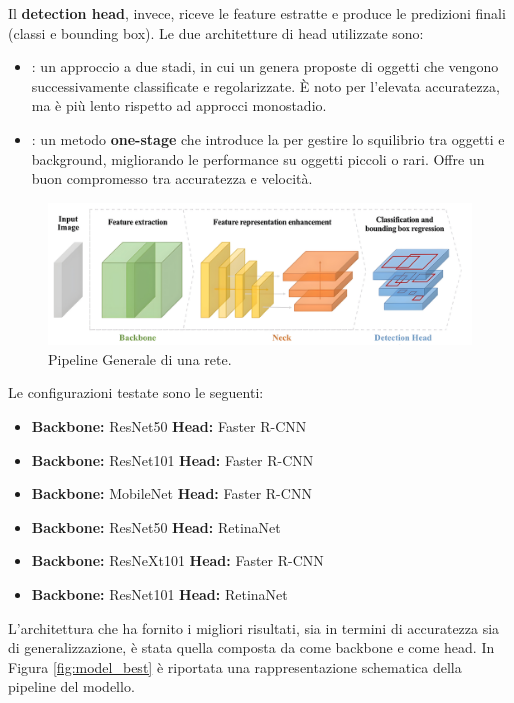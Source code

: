 \documentclass[minted, draw]{../tex/hebdomon}
\begin{document}
Il \textbf{detection head}, invece, riceve le feature estratte e produce le predizioni finali (classi e bounding box). Le due architetture di head utilizzate sono:

\begin{itemize}
	\item {}: un approccio a due stadi, in cui un  genera proposte di oggetti che vengono successivamente classificate e regolarizzate. È noto per l’elevata accuratezza, ma è più lento rispetto ad approcci monostadio.
	\item {}: un metodo \textbf{one-stage} che introduce la  per gestire lo squilibrio tra oggetti e background, migliorando le performance su oggetti piccoli o rari. Offre un buon compromesso tra accuratezza e velocità.
\end{itemize}

%
\begin{figure}[H]
  \centering
  \includegraphics[width=\linewidth]{figures/general_pipeline.png}
  \caption{Pipeline Generale di una rete.}
  \label{fig:general_pipeline}
\end{figure}
%

Le configurazioni testate sono le seguenti:
\begin{itemize}
    \item \textbf{Backbone:} ResNet50 \quad \textbf{Head:} Faster R-CNN
    \item \textbf{Backbone:} ResNet101 \quad \textbf{Head:} Faster R-CNN
    \item \textbf{Backbone:} MobileNet \quad \textbf{Head:} Faster R-CNN
    \item \textbf{Backbone:} ResNet50 \quad \textbf{Head:} RetinaNet
    \item \textbf{Backbone:} ResNeXt101 \quad \textbf{Head:} Faster R-CNN
    \item \textbf{Backbone:} ResNet101 \quad \textbf{Head:} RetinaNet
\end{itemize}

L’architettura che ha fornito i migliori risultati, sia in termini di accuratezza sia di generalizzazione, è stata quella composta da  come backbone e  come head. In Figura \ref{fig:model_best} è riportata una rappresentazione schematica della pipeline del modello.
\end{document}
